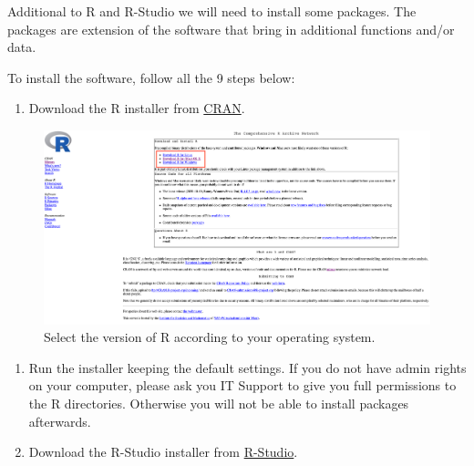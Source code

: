 \documentclass[
]{svmono}
\providecommand{\tightlist}{%
  \setlength{\itemsep}{0pt}\setlength{\parskip}{0pt}}
\begin{document}
Additional to R and R-Studio we will need to install some packages. The
packages are extension of the software that bring in additional
functions and/or data.

To install the software, follow all the 9 steps below:

\begin{enumerate}
\def\labelenumi{\arabic{enumi}.}
\tightlist
\item
  Download the R installer from \href{https://cran.r-project.org/}{CRAN}.\\
\end{enumerate}

\begin{figure}[H]

{\centering \includegraphics[width=0.8\linewidth,]{images/cran} 

}

\caption{Select the version of R according to your operating system.}\label{fig:unnamed-chunk-2}
\end{figure}

\begin{enumerate}
\def\labelenumi{\arabic{enumi}.}
\setcounter{enumi}{1}
\item
  Run the installer keeping the default settings. If you do not have admin rights on your computer, please ask you IT Support to give you full permissions to the R directories. Otherwise you will not be able to install packages afterwards.
\item
  Download the R-Studio installer from \href{https://rstudio.com/products/rstudio/download/\#download}{R-Studio}.\\
\end{enumerate}
\end{document}
